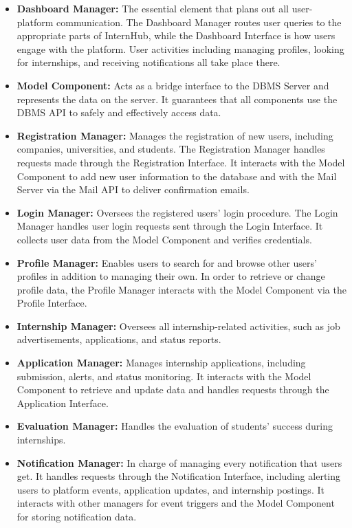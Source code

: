 \begin{itemize}
    \item \textbf{Dashboard Manager:} The essential element that plans out all user-platform communication. The Dashboard Manager routes user queries to the appropriate parts of InternHub, while the Dashboard Interface is how users engage with the platform. User activities including managing profiles, looking for internships, and receiving notifications all take place there.

    \item \textbf{Model Component:} Acts as a bridge interface to the DBMS Server and represents the data on the server. It guarantees that all components use the DBMS API to safely and effectively access data.

    \item \textbf{Registration Manager:} Manages the registration of new users, including companies, universities, and students. The Registration Manager handles requests made through the Registration Interface. It interacts with the Model Component to add new user information to the database and with the Mail Server via the Mail API to deliver confirmation emails.

    \item \textbf{Login Manager:} Oversees the registered users' login procedure. The Login Manager handles user login requests sent through the Login Interface. It collects user data from the Model Component and verifies credentials.

    \item \textbf{Profile Manager:} Enables users to search for and browse other users' profiles in addition to managing their own. In order to retrieve or change profile data, the Profile Manager interacts with the Model Component via the Profile Interface.

    \item \textbf{Internship Manager:} Oversees all internship-related activities, such as job advertisements, applications, and status reports.
    \item \textbf{Application Manager:} Manages internship applications, including submission, alerts, and status monitoring. It interacts with the Model Component to retrieve and update data and handles requests through the Application Interface.

    \item \textbf{Evaluation Manager:} Handles the evaluation of students' success during internships.
    \item \textbf{Notification Manager:} In charge of managing every notification that users get. It handles requests through the Notification Interface, including alerting users to platform events, application updates, and internship postings. It interacts with other managers for event triggers and the Model Component for storing notification data.

\end{itemize}


